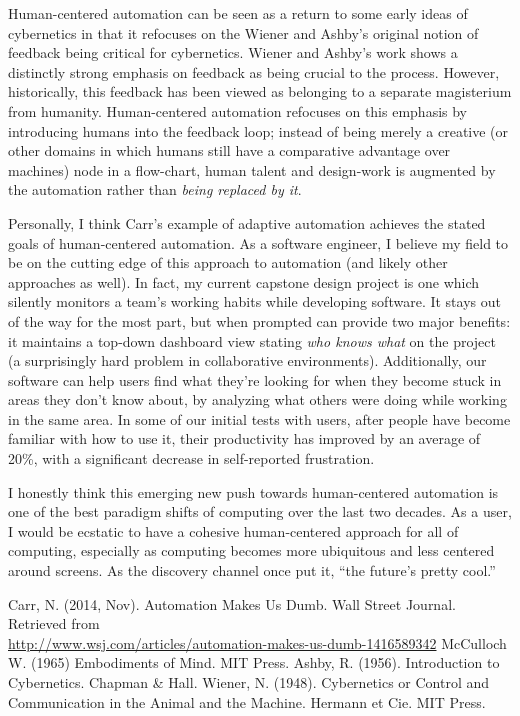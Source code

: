 \documentclass{article}
\begin{document}
Human-centered automation can be seen as a return to some early ideas of cybernetics in that it refocuses on the Wiener
and Ashby's original notion of feedback being critical for cybernetics\cite{ashby56}\cite{wiener}. Wiener and Ashby's
work shows a distinctly strong emphasis on feedback as being crucial to the process. However, historically, this
feedback has been viewed as belonging to a separate magisterium from humanity. Human-centered automation refocuses on
this emphasis by introducing humans into the feedback loop; instead of being merely a creative (or other domains in
which humans still have a comparative advantage over machines) node in a flow-chart, human talent and design-work is
augmented by the automation rather than \emph{being replaced by it}.

Personally, I think Carr's example of adaptive automation achieves the stated goals of human-centered automation. As a
software engineer, I believe my field to be on the cutting edge of this approach to automation (and likely other
approaches as well). In fact, my current capstone design project is one which silently monitors a team's working habits
while developing software. It stays out of the way for the most part, but when prompted can provide two major benefits:
it maintains a top-down dashboard view stating \emph{who knows what} on the project (a surprisingly hard problem in
collaborative environments). Additionally, our software can help users find what they're looking for when they become
stuck in areas they don't know about, by analyzing what others were doing while working in the same area. In some of our
initial tests with users, after people have become familiar with how to use it, their productivity has improved by an
average of 20\%, with a significant decrease in self-reported frustration.

I honestly think this emerging new push towards human-centered automation is one of the best paradigm shifts of
computing over the last two decades. As a user, I would be ecstatic to have a cohesive human-centered approach for all
of computing, especially as computing becomes more ubiquitous and less centered around screens. As the discovery channel
once put it, ``the future's pretty cool.''


\begin{thebibliography}{1}
        Carr, N. (2014, Nov). Automation Makes Us Dumb. Wall Street Journal. Retrieved from \\
        \url{http://www.wsj.com/articles/automation-makes-us-dumb-1416589342}
        McCulloch W. (1965) Embodiments of Mind. MIT Press.
        Ashby, R. (1956). Introduction to Cybernetics. Chapman \& Hall.
        Wiener, N. (1948). Cybernetics or Control and Communication in the Animal and the Machine. Hermann et Cie. MIT Press.
\end{thebibliography}
\end{document}
